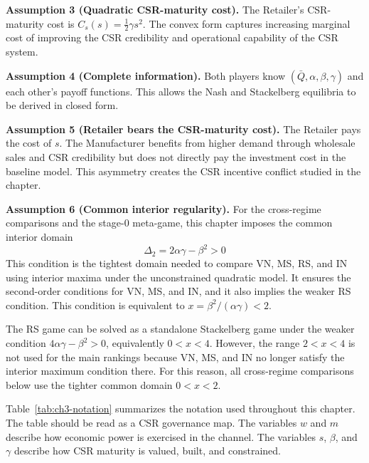 \textbf{Assumption 3 (Quadratic CSR-maturity cost).} The Retailer's CSR-maturity cost is $C_s(s)=\frac12\gamma s^2$. The convex form captures increasing marginal cost of improving the CSR credibility and operational capability of the CSR system.

\textbf{Assumption 4 (Complete information).} Both players know $(\bar{Q},\alpha,\beta,\gamma)$ and each other's payoff functions. This allows the Nash and Stackelberg equilibria to be derived in closed form.

\textbf{Assumption 5 (Retailer bears the CSR-maturity cost).} The Retailer pays the cost of $s$. The Manufacturer benefits from higher demand through wholesale sales and CSR credibility but does not directly pay the investment cost in the baseline model. This asymmetry creates the CSR incentive conflict studied in the chapter.

\textbf{Assumption 6 (Common interior regularity).} 
For the cross-regime comparisons and the stage-0 meta-game, this chapter imposes the common interior domain
\begin{equation}
    \Delta_2=2\alpha\gamma-\beta^2>0
    \label{eq:common_regularity}
\end{equation}
This condition is the tightest domain needed to compare VN, MS, RS, and IN using interior maxima under the unconstrained quadratic model. It ensures the second-order conditions for VN, MS, and IN, and it also implies the weaker RS condition. This condition is equivalent to $x=\beta^2/(\alpha\gamma)<2$. 

The RS game can be solved as a standalone Stackelberg game under the weaker condition $4\alpha\gamma-\beta^2>0$, equivalently $0<x<4$. However, the range $2<x<4$ is not used for the main rankings because VN, MS, and IN no longer satisfy the interior maximum condition there. For this reason, all cross-regime comparisons below use the tighter common domain $0<x<2$.

Table~\ref{tab:ch3-notation} summarizes the notation used throughout this chapter. The table should be read as a CSR governance map. The variables $w$ and $m$ describe how economic power is exercised in the channel. The variables $s$, $\beta$, and $\gamma$ describe how CSR maturity is valued, built, and constrained.

